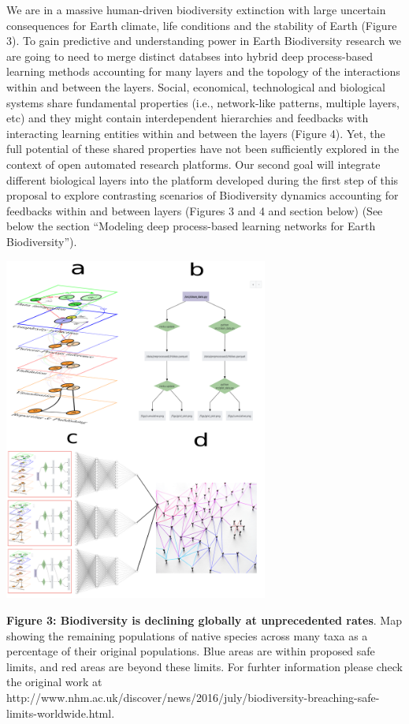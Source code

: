 \documentclass[authoryear,1p,12pt]{elsarticle}
\begin{document}
     We are in a massive human-driven biodiversity extinction with
     large uncertain consequences for Earth climate, life conditions
     and the stability of Earth (Figure 3). To gain predictive and
     understanding power in Earth Biodiversity research we are going
     to need to merge distinct databses into hybrid deep process-based
     learning methods accounting for many layers and the topology of
     the interactions within and between the
     layers\citep{Melianetal:2018}. Social, economical, technological
     and biological systems share fundamental properties (i.e.,
     network-like patterns, multiple layers, etc) and they might
     contain interdependent hierarchies and feedbacks with interacting
     learning entities within and between the layers (Figure 4). Yet,
     the full potential of these shared properties have not been
     sufficiently explored in the context of open automated research
     platforms. Our second goal will integrate different biological
     layers into the platform developed during the first step of this
     proposal to explore contrasting scenarios of Biodiversity
     dynamics accounting for feedbacks within and between layers
     (Figures 3 and 4 and section below) (See below the section
     ``Modeling deep process-based learning networks for Earth
     Biodiversity'').

 \begin{center}
       \includegraphics[width=0.65\textwidth]{Figure1}
  \end{center}
  \caption{{\bf Figure 3: Biodiversity is declining globally at
      unprecedented rates}. Map showing the remaining populations of
    native species across many taxa as a percentage of their original
    populations. Blue areas are within proposed safe limits, and red
    areas are beyond these limits. For furhter information please
    check the original work at
    {http://www.nhm.ac.uk/discover/news/2016/july/biodiversity-breaching-safe-limits-worldwide.html}.}
     
\end{document}
